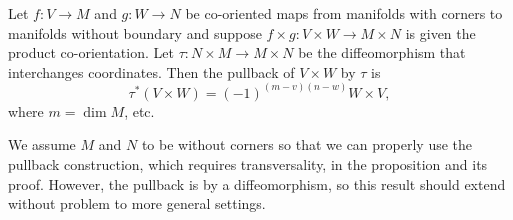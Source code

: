 \begin{proposition}\label{P: exterior commutativity}
	Let $f \colon V \to M$ and $g \colon W \to N$ be co-oriented maps from manifolds with corners to manifolds without boundary and suppose $f \times g \colon V \times W \to M \times N$ is given the product co-orientation.
	Let $\tau \colon N \times M \to M \times N$ be the diffeomorphism that interchanges coordinates.
	Then the pullback of $V \times W$ by $\tau$ is $$\tau^*(V \times W) = (-1)^{(m-v)(n-w)}W \times V,$$ where $m = \dim M$, etc.
\end{proposition}
We assume $M$ and $N$ to be without corners so that we can properly use the pullback construction, which requires transversality, in the proposition and its proof.
However, the pullback is by a diffeomorphism, so this result should extend without problem to more general settings.
